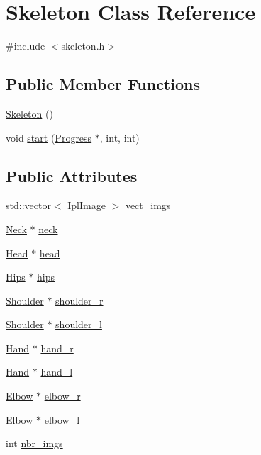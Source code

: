 \hypertarget{class_skeleton}{\section{Skeleton Class Reference}
\label{class_skeleton}
}


{\ttfamily \#include $<$skeleton.\+h$>$}

\subsection*{Public Member Functions}
\begin{DoxyCompactItemize}
\item 
\hyperlink{class_skeleton_af01a02f1ce9ae4c801cd6e66ccf7407f}{Skeleton} ()
\item 
void \hyperlink{class_skeleton_aa59f0e02331be5c464231bcf42996fa6}{start} (\hyperlink{class_progress}{Progress} $\ast$, int, int)
\end{DoxyCompactItemize}
\subsection*{Public Attributes}
\begin{DoxyCompactItemize}
\item 
std\+::vector$<$ Ipl\+Image $>$ \hyperlink{class_skeleton_a823010dbe6f31708e0e3f9fae9ddbcbb}{vect\+\_\+imgs}
\item 
\hyperlink{class_neck}{Neck} $\ast$ \hyperlink{class_skeleton_ab3d170bea51a2fd6997754c1e4b925f6}{neck}
\item 
\hyperlink{class_head}{Head} $\ast$ \hyperlink{class_skeleton_a14e43c932ccae2c28d9fa6ba689166fe}{head}
\item 
\hyperlink{class_hips}{Hips} $\ast$ \hyperlink{class_skeleton_ae03a158780d9cd9fca8f98001a836c75}{hips}
\item 
\hyperlink{class_shoulder}{Shoulder} $\ast$ \hyperlink{class_skeleton_a6646dc69bf5eeace8db045b1521c3329}{shoulder\+\_\+r}
\item 
\hyperlink{class_shoulder}{Shoulder} $\ast$ \hyperlink{class_skeleton_a76cd871e49748946effbcf383b331dc3}{shoulder\+\_\+l}
\item 
\hyperlink{class_hand}{Hand} $\ast$ \hyperlink{class_skeleton_aaacf1c662b8e4d8940d9e6e42693038d}{hand\+\_\+r}
\item 
\hyperlink{class_hand}{Hand} $\ast$ \hyperlink{class_skeleton_a3dc91eda04e16c494e8e4bff81fe982c}{hand\+\_\+l}
\item 
\hyperlink{class_elbow}{Elbow} $\ast$ \hyperlink{class_skeleton_a61337002c2e590b108b3865d52110983}{elbow\+\_\+r}
\item 
\hyperlink{class_elbow}{Elbow} $\ast$ \hyperlink{class_skeleton_a3ffb0549ea2c7866d5ae7ca5a4b3d49a}{elbow\+\_\+l}
\item 
int \hyperlink{class_skeleton_a0c481346ada398ff1e9d9763aa46b7c5}{nbr\+\_\+imgs}
\end{DoxyCompactItemize}


